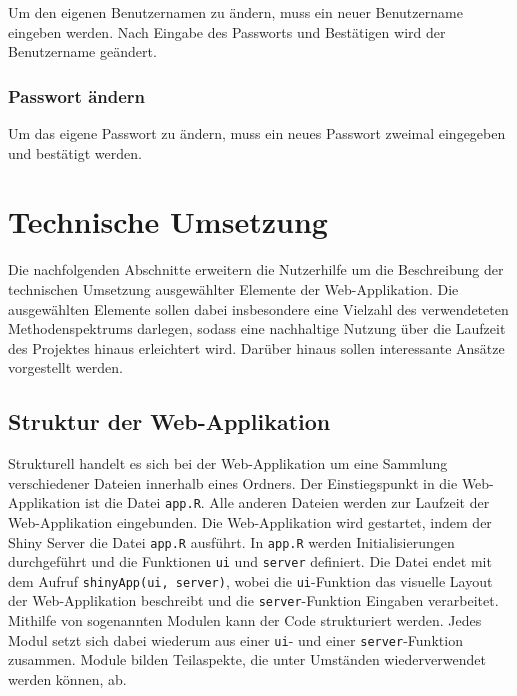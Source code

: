 \documentclass[
]{article}
\begin{document}
Um den eigenen Benutzernamen zu ändern, muss ein neuer Benutzername eingeben werden. Nach Eingabe des Passworts und Bestätigen wird der Benutzername geändert.

\hypertarget{passwort-uxe4ndern}{%
\subsubsection{Passwort ändern}\label{passwort-uxe4ndern}}

Um das eigene Passwort zu ändern, muss ein neues Passwort zweimal eingegeben und bestätigt werden.

\hypertarget{technical-guide}{%
\section{Technische Umsetzung}\label{technical-guide}}

Die nachfolgenden Abschnitte erweitern die Nutzerhilfe um die Beschreibung der technischen Umsetzung ausgewählter Elemente der Web-Applikation. Die ausgewählten Elemente sollen dabei insbesondere eine Vielzahl des verwendeteten Methodenspektrums darlegen, sodass eine nachhaltige Nutzung über die Laufzeit des Projektes hinaus erleichtert wird. Darüber hinaus sollen interessante Ansätze vorgestellt werden.

\hypertarget{struktur-der-web-applikation}{%
\subsection{Struktur der Web-Applikation}\label{struktur-der-web-applikation}}

Strukturell handelt es sich bei der Web-Applikation um eine Sammlung verschiedener Dateien innerhalb eines Ordners. Der Einstiegspunkt in die Web-Applikation ist die Datei \texttt{app.R}. Alle anderen Dateien werden zur Laufzeit der Web-Applikation eingebunden. Die Web-Applikation wird gestartet, indem der Shiny Server die Datei \texttt{app.R} ausführt. In \texttt{app.R} werden Initialisierungen durchgeführt und die Funktionen \texttt{ui} und \texttt{server} definiert. Die Datei endet mit dem Aufruf \texttt{shinyApp(ui,\ server)}, wobei die \texttt{ui}-Funktion das visuelle Layout der Web-Applikation beschreibt und die \texttt{server}-Funktion Eingaben verarbeitet. Mithilfe von sogenannten Modulen kann der Code strukturiert werden. Jedes Modul setzt sich dabei wiederum aus einer \texttt{ui}- und einer \texttt{server}-Funktion zusammen. Module bilden Teilaspekte, die unter Umständen wiederverwendet werden können, ab. \autocite{shiny-modules}
\end{document}
